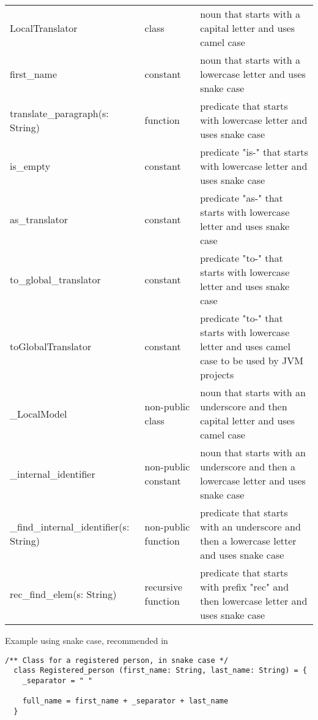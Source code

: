 \begin{tabular}{lll}
    LocalTranslator                         & class               & noun that starts with a capital letter and uses camel case                                       \\
    first\_name                             & constant            & noun that starts with a lowercase letter and uses snake case                                     \\
    translate\_paragraph(s: String)         & function            & predicate that starts with lowercase letter and uses snake case                                  \\
    is\_empty                               & constant            & predicate "is-" that starts with lowercase letter and uses snake case                            \\
    as\_translator                          & constant            & predicate "as-" that starts with lowercase letter and uses snake case                            \\
    to\_global\_translator                  & constant            & predicate "to-" that starts with lowercase letter and uses snake case                            \\
    toGlobalTranslator                      & constant            & predicate "to-" that starts with lowercase letter and uses camel case to be used by JVM projects \\
    \_LocalModel                            & non-public class    & noun that starts with an underscore and then capital letter and uses camel case                  \\
    \_internal_identifier                   & non-public constant & noun that starts with an underscore and then a lowercase letter and uses snake case              \\
    \_find\_internal\_identifier(s: String) & non-public function & predicate that starts with an underscore and then a lowercase letter and uses snake case         \\
    rec\_find\_elem(s: String)              & recursive function  & predicate that starts with prefix "rec" and then lowercase letter and uses snake case            \\
\end{tabular}

Example using snake case, recommended in \Soda

\begin{lstlisting}[label={lst:exampleExtendsSnakeCase}]
  /** Class for a registered person, in snake case */
  class Registered_person (first_name: String, last_name: String) = {
    _separator = " "

    full_name = first_name + _separator + last_name
  }
\end{lstlisting}

